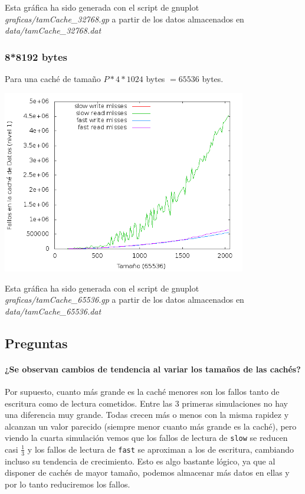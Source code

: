 \documentclass[nochap]{apuntes}
\begin{document}
Esta gráfica ha sido generada con el script de gnuplot \emph{graficas/tamCache\_32768.gp} a partir de los datos almacenados en \emph{data/tamCache\_32768.dat}

\subsubsection*{8*8192 bytes}
Para una caché de tamaño $P*4*1024$ bytes $= 65536 $ bytes.

\begin{center}
\includegraphics[width=0.8\textwidth]{graficas/fotos/Cache_65536.png}
\end{center}

Esta gráfica ha sido generada con el script de gnuplot \emph{graficas/tamCache\_65536.gp} a partir de los datos almacenados en \emph{data/tamCache\_65536.dat}


\subsection*{Preguntas}

 \paragraph{¿Se observan cambios de tendencia al variar los tamaños de las cachés?}

Por supuesto, cuanto más grande es la caché menores son los fallos tanto de escritura como de lectura cometidos. Entre las 3 primeras simulaciones no hay una diferencia muy grande. Todas crecen más o menos con la misma rapidez y alcanzan un valor parecido (siempre menor cuanto más grande es la caché), pero viendo la cuarta simulación vemos que los fallos de lectura de \texttt{slow} se reducen casi $\frac{1}{3}$ y los fallos de lectura de \texttt{fast} se aproximan a los de escritura, cambiando incluso su tendencia de crecimiento. Esto es algo bastante lógico, ya que al disponer de cachés de mayor tamaño, podemos almacenar más datos en ellas y por lo tanto reduciremos los fallos.
\end{document}

